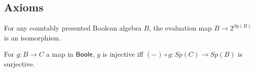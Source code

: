 \subsection{Axioms}\label{Axioms}
\begin{axiomNum}\label{AxStoneDuality}
  For any countably presented Boolean algebra $B$, 
  the evaluation map $B\rightarrow  2^{Sp(B)}$ is an isomorphism.
\end{axiomNum} 


\begin{axiomNum}\label{SurjectionsAreFormalSurjections}
  For $g:B\to C$ a map in $\mathsf{Boole}$, $g$ is injective iff 
  $(-)\circ g: Sp(C) \to Sp(B)$ is surjective. 
\end{axiomNum} 
%

